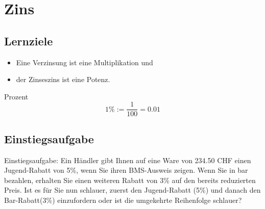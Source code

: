
\newpage
\section{Zins}
\subsection*{Lernziele}

\begin{itemize}
  \item Eine Verzinsung ist eine  Multiplikation und
  \item der Zinseszins ist eine Potenz.

\end{itemize}

\begin{definition}{Prozent}{}\index{$\%$}
$$1\% := \frac1{100} = 0.01$$
\end{definition}

\subsection{Einstiegsaufgabe}
Einstiegsaufgabe:
Ein Händler gibt Ihnen auf eine Ware von 234.50 CHF einen Jugend-Rabatt von
5\%, wenn Sie ihren BMS-Ausweis zeigen. Wenn Sie in bar bezahlen, erhalten Sie
einen weiteren Rabatt von 3\% auf den bereits reduzierten Preis.
Ist es für Sie nun schlauer, zuerst den
Jugend-Rabatt (5\%) und danach den Bar-Rabatt(3\%) einzufordern oder
ist die umgekehrte Reihenfolge schlauer?



\newpage




